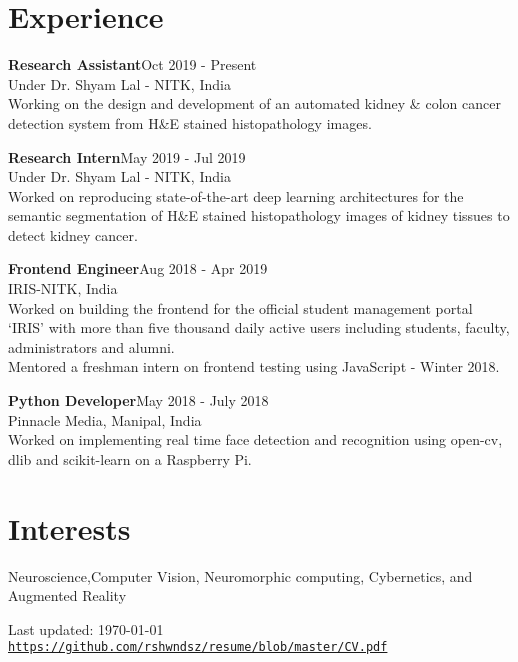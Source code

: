 \documentclass[letterpaper]{article}
\def\footerlink{https://github.com/rshwndsz/resume/blob/master/CV.pdf}
\renewenvironment{itemize}{
  \begin{list}{}{
    \setlength{\leftmargin}{1.5em}
  }
}{
  \end{list}
}
\newcommand{\datefont}[1]{\textcolor{black!80}{\small{#1}}}
\begin{document}
\section*{Experience}
  \begin{itemize}
    \item \textbf{Research Assistant}\hfill{\textcolor{black!80}{\small{Oct 2019 - Present}}}\\
    \datefont{Under Dr. Shyam Lal - NITK, India}\\
    Working on the design and development of an automated kidney \& colon cancer detection system from H\&E stained histopathology images.

    \item \textbf{Research Intern}\hfill{\textcolor{black!80}{\small{May 2019 - Jul 2019}}}\\
    \datefont{Under Dr. Shyam Lal - NITK, India}\\
    Worked on reproducing state-of-the-art deep learning architectures for the semantic segmentation of H\&E stained histopathology images of kidney tissues to detect kidney cancer.

    \item \textbf{Frontend Engineer}\hfill{\textcolor{black!80}{\small{Aug 2018 - Apr 2019}}}\\
    \datefont{IRIS-NITK, India}\\
    Worked on building the frontend for the official student management portal `IRIS' with more than five thousand daily active users including students, faculty, administrators and alumni.\\
    Mentored a freshman intern on frontend testing using JavaScript - Winter 2018.

    \item \textbf{Python Developer}\hfill{\textcolor{black!80}{\small{May 2018 - July 2018}}}\\
    \datefont{Pinnacle Media, Manipal, India}\\
    Worked on implementing real time face detection and recognition using open-cv, dlib and scikit-learn on a Raspberry Pi.
  \end{itemize}


\section*{Interests}
  \begin{itemize}
    \item Neuroscience,Computer Vision, Neuromorphic computing, Cybernetics, and Augmented Reality
  \end{itemize}


\bigskip
\begin{center}
  \begin{footnotesize}
    Last updated: \today \\
    \href{\footerlink}{\texttt{\footerlink}}
  \end{footnotesize}
\end{center}
\end{document}
